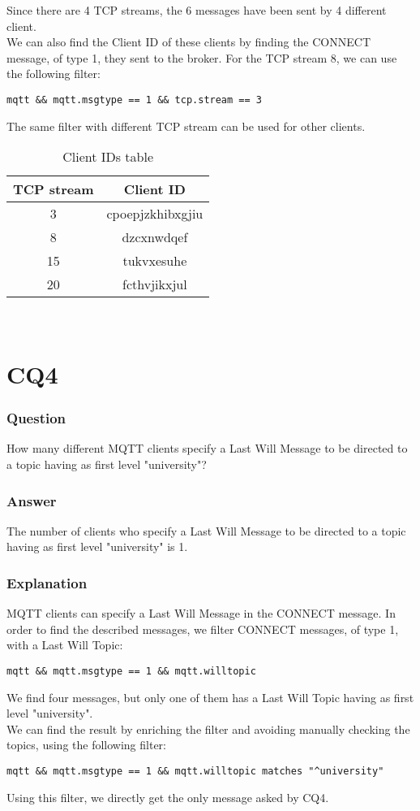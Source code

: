 Since there are 4 TCP streams, the 6 messages have been sent by 4 different client.	\\
We can also find the Client ID of these clients by finding the CONNECT message, of type 1, they sent to the broker. For the TCP stream 8, we can use the following filter:
\begin{verbatim}
mqtt && mqtt.msgtype == 1 && tcp.stream == 3 
\end{verbatim}
The same filter with different TCP stream can be used for other clients.

\begin{table}[H]
\centering 
\begin{tabular}{| c | c |}
	\hline 
	\rowcolor{bluepoli!40}
	\textbf{TCP stream} & \textbf{Client ID}\T\B \\
	\hline 
	3 & cpoepjzkhibxgjiu \T\B\\
	8 & dzcxnwdqef \T\B\\
	15 & tukvxesuhe \T\B\\
	20 & fcthvjikxjul \T\B\\
	\hline
\end{tabular}
\\[10pt]
\caption{Client IDs table}
\label{table:client_ids_table}
\end{table}

\section{CQ4}
\subsubsection{Question}
How many different MQTT clients specify a Last Will Message to be directed to a topic having as first level "university"?

\subsubsection{Answer}
The number of clients who specify a Last Will Message to be directed to a topic having as first level "university" is 1.

\subsubsection{Explanation}
MQTT clients can specify a Last Will Message in the CONNECT message. In order to find the described messages, we filter CONNECT messages, of type 1, with a Last Will Topic:
\begin{verbatim}
mqtt && mqtt.msgtype == 1 && mqtt.willtopic
\end{verbatim}
We find four messages, but only one of them has a Last Will Topic having as first level "university".\\
We can find the result by enriching the filter and avoiding manually checking the topics, using the following filter:
\begin{verbatim}
mqtt && mqtt.msgtype == 1 && mqtt.willtopic matches "^university"
\end{verbatim}
Using this filter, we directly get the only message asked by CQ4.

